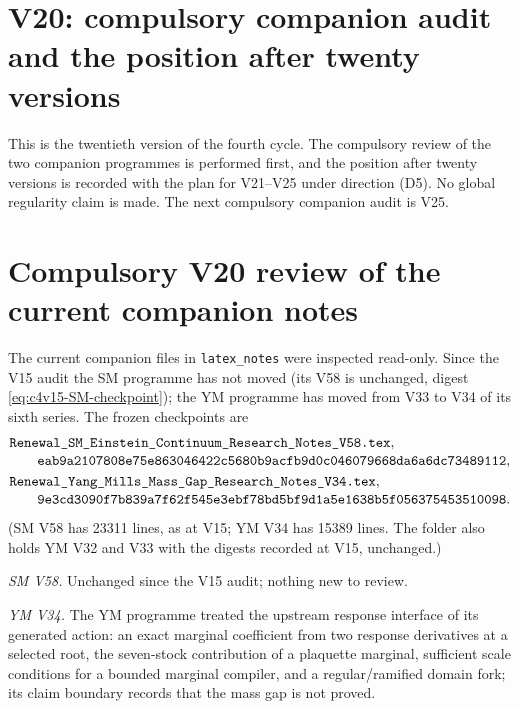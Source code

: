 \documentclass[11pt]{article}
\theoremstyle{plain}
\theoremstyle{definition}
\theoremstyle{remark}
\begin{document}
\section{V20: compulsory companion audit and the position after twenty versions}
\label{sec:c4v20-entry}

This is the twentieth version of the fourth cycle.  The compulsory
review of the two companion programmes is performed first, and the
position after twenty versions is recorded with the plan for
V21--V25 under direction (D5).  No global regularity claim is made.
The next compulsory companion audit is V25.

\section{Compulsory V20 review of the current companion notes}
\label{sec:c4v20-companion-audit}

The current companion files in \texttt{latex\_notes} were inspected
read-only.  Since the V15 audit the SM programme has not moved (its
V58 is unchanged, digest \eqref{eq:c4v15-SM-checkpoint}); the YM
programme has moved from V33 to V34 of its sixth series.  The frozen
checkpoints are
\begin{align}
 &\texttt{Renewal\_SM\_Einstein\_Continuum\_Research\_Notes\_V58.tex},
 \notag\\[-2pt]
 &\qquad
 \texttt{eab9a2107808e75e863046422c5680b9acfb9d0c046079668da6a6dc73489112},
 \label{eq:c4v20-SM-checkpoint}\\
 &\texttt{Renewal\_Yang\_Mills\_Mass\_Gap\_Research\_Notes\_V34.tex},
 \notag\\[-2pt]
 &\qquad
 \texttt{9e3cd3090f7b839a7f62f545e3ebf78bd5bf9d1a5e1638b5f056375453510098}.
 \label{eq:c4v20-YM-checkpoint}
\end{align}
(SM V58 has 23311 lines, as at V15; YM V34 has 15389 lines.  The
folder also holds YM V32 and V33 with the digests recorded at V15,
unchanged.)

\emph{SM V58.}  Unchanged since the V15 audit; nothing new to
review.

\emph{YM V34.}  The YM programme treated the upstream response
interface of its generated action: an exact marginal coefficient
from two response derivatives at a selected root, the seven-stock
contribution of a plaquette marginal, sufficient scale conditions
for a bounded marginal compiler, and a regular/ramified domain
fork; its claim boundary records that the mass gap is not proved.
\end{document}
